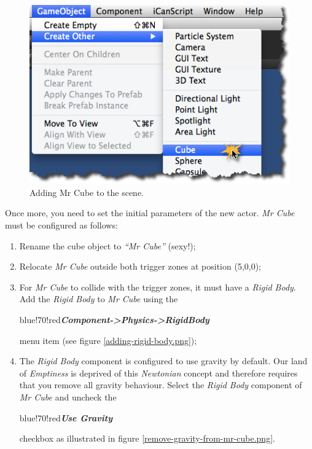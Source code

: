 \begin{figure}[htbp]
\centering
\includegraphics[keepaspectratio,width=\textwidth,height=0.75\textheight]{adding-mr-cube.png}
\caption{Adding Mr Cube to the scene.}
\label{adding-mr-cube.png}
\end{figure}

Once more, you need to set the initial parameters of the new actor. \emph{Mr Cube} must be configured as follows:

\begin{enumerate}
\item Rename the cube object to \emph{``Mr Cube''} (sexy!);

\item Relocate \emph{Mr Cube} outside both trigger zones at position (5,0,0);

\item For \emph{Mr Cube} to collide with the trigger zones, it must have a \emph{Rigid Body}. Add the \emph{Rigid Body} to \emph{Mr Cube} using the \begin{color}{blue!70!red}\emph{\textbf{Component->Physics->RigidBody}}\end{color} menu item (see figure \ref{adding-rigid-body.png});

\item The \emph{Rigid Body} component is configured to use gravity by default. Our land of \emph{Emptiness} is deprived of this \emph{Newtonian} concept and therefore requires that you remove all gravity behaviour. Select the \emph{Rigid Body} component of \emph{Mr Cube} and uncheck the \begin{color}{blue!70!red}\emph{\textbf{Use Gravity}}\end{color} checkbox as illustrated in figure \ref{remove-gravity-from-mr-cube.png}.

\end{enumerate}

